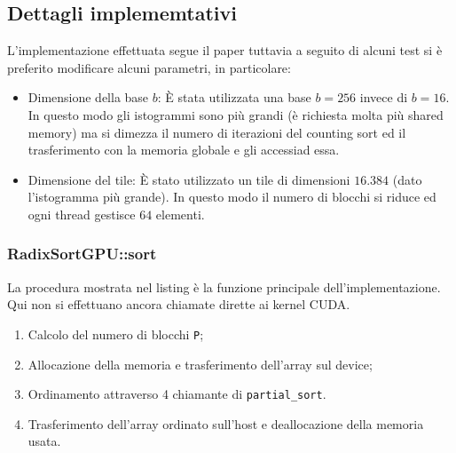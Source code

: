 \subsection{Dettagli implememtativi}
L'implementazione effettuata segue il paper \cite{Satish2009} tuttavia a seguito di alcuni test si è preferito modificare alcuni parametri, in particolare:
\begin{itemize}
	\item Dimensione della base $b$: È stata utilizzata una base $b=256$ invece di $b=16$. In questo modo gli istogrammi sono più grandi (è richiesta molta più shared memory) ma si dimezza il numero di iterazioni del counting sort ed il trasferimento con la memoria globale e gli accessiad essa.
	\item Dimensione del tile: È stato utilizzato un tile di dimensioni $16.384$ (dato l'istogramma più grande). In questo modo il numero di blocchi si riduce ed ogni thread gestisce $64$ elementi.
\end{itemize}


\subsubsection{RadixSortGPU::sort}
La procedura  mostrata nel listing  è la funzione principale dell'implementazione. Qui non si effettuano ancora chiamate dirette ai kernel CUDA.
\begin{enumerate}
\item Calcolo del numero di blocchi \texttt{P};
\item Allocazione della memoria e trasferimento dell'array sul device;
\item Ordinamento attraverso 4 chiamante di \texttt{partial\_sort}. %
\item Trasferimento dell'array ordinato sull'host e deallocazione della memoria usata.
\end{enumerate}

